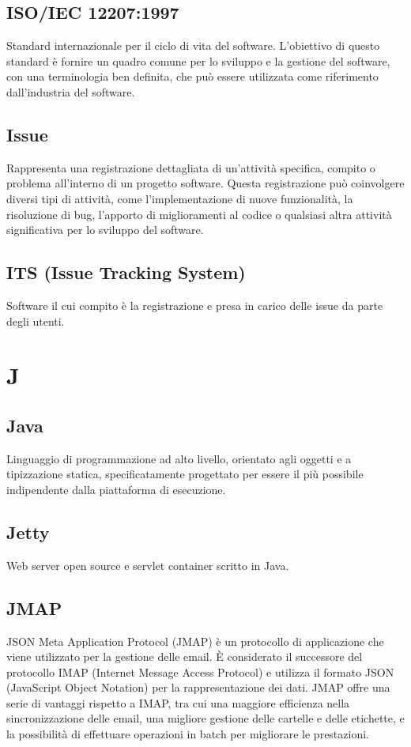 \documentclass[12pt]{article}
\begin{document}
		\subsection{ISO/IEC 12207:1997}
			Standard internazionale per il ciclo di vita del software. L'obiettivo di questo standard è fornire un quadro comune per lo sviluppo e la gestione del software, con una terminologia ben definita, che può essere utilizzata come riferimento dall'industria del software.

		\subsection{Issue}
			Rappresenta una registrazione dettagliata di un'attività specifica, compito o problema all'interno di un progetto software. Questa registrazione può coinvolgere diversi tipi di attività, come l'implementazione di nuove funzionalità, la risoluzione di bug, l'apporto di miglioramenti al codice o qualsiasi altra attività significativa per lo sviluppo del software.

		\subsection{ITS (Issue Tracking System)}
			Software il cui compito è la registrazione e presa in carico delle issue da parte degli utenti.
	\clearpage
	\section{J}
		\subsection{Java}
			Linguaggio di programmazione ad alto livello, orientato agli oggetti e a tipizzazione statica, specificatamente progettato per essere il più possibile indipendente dalla piattaforma di esecuzione.
		\subsection{Jetty}
			Web server open source e servlet container scritto in Java.

		\subsection{JMAP}
			JSON Meta Application Protocol (JMAP) è un protocollo di applicazione che viene utilizzato per la gestione delle email. È considerato il successore del protocollo IMAP (Internet Message Access Protocol) e utilizza il formato JSON (JavaScript Object Notation) per la rappresentazione dei dati. JMAP offre una serie di vantaggi rispetto a IMAP, tra cui una maggiore efficienza nella sincronizzazione delle email, una migliore gestione delle cartelle e delle etichette, e la possibilità di effettuare operazioni in batch per migliorare le prestazioni. 
\end{document}
